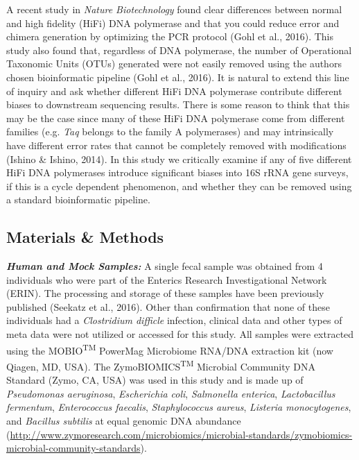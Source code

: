 \documentclass[12pt,]{article}
\begin{document}
A recent study in \emph{Nature Biotechnology} found clear differences
between normal and high fidelity (HiFi) DNA polymerase and that you
could reduce error and chimera generation by optimizing the PCR protocol
(Gohl et al., 2016). This study also found that, regardless of DNA
polymerase, the number of Operational Taxonomic Units (OTUs) generated
were not easily removed using the authors chosen bioinformatic pipeline
(Gohl et al., 2016). It is natural to extend this line of inquiry and
ask whether different HiFi DNA polymerase contribute different biases to
downstream sequencing results. There is some reason to think that this
may be the case since many of these HiFi DNA polymerase come from
different families (e.g. \emph{Taq} belongs to the family A polymerases)
and may intrinsically have different error rates that cannot be
completely removed with modifications (Ishino \& Ishino, 2014). In this
study we critically examine if any of five different HiFi DNA
polymerases introduce significant biases into 16S rRNA gene surveys, if
this is a cycle dependent phenomenon, and whether they can be removed
using a standard bioinformatic pipeline.

\newpage

\subsection{Materials \& Methods}\label{materials-methods}

\textbf{\emph{Human and Mock Samples:}} A single fecal sample was
obtained from 4 individuals who were part of the Enterics Research
Investigational Network (ERIN). The processing and storage of these
samples have been previously published (Seekatz et al., 2016). Other
than confirmation that none of these individuals had a \emph{Clostridium
difficle} infection, clinical data and other types of meta data were not
utilized or accessed for this study. All samples were extracted using
the MOBIO\textsuperscript{TM} PowerMag Microbiome RNA/DNA extraction kit
(now Qiagen, MD, USA). The ZymoBIOMICS\textsuperscript{TM} Microbial
Community DNA Standard (Zymo, CA, USA) was used in this study and is
made up of \emph{Pseudomonas aeruginosa}, \emph{Escherichia coli},
\emph{Salmonella enterica}, \emph{Lactobacillus fermentum},
\emph{Enterococcus faecalis}, \emph{Staphylococcus aureus},
\emph{Listeria monocytogenes}, and \emph{Bacillus subtilis} at equal
genomic DNA abundance
(\url{http://www.zymoresearch.com/microbiomics/microbial-standards/zymobiomics-microbial-community-standards}).
\end{document}
